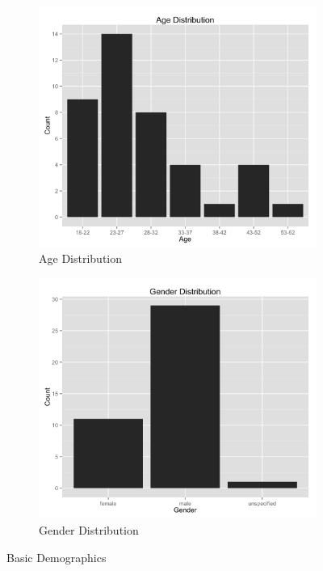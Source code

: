 \documentclass{article}
\begin{document}
\begin{figure}[t]
\centering
\begin{subfigure}{.5\textwidth}
    \centering
    \includegraphics[width=1.0\linewidth]{age.png}
    \caption{Age Distribution}
    \label{agedistribution}
\end{subfigure}%
\begin{subfigure}{.5\textwidth}
    \centering
    \includegraphics[width=1.0\linewidth]{gender.png}
    \caption{Gender Distribution}
    \label{genderdistribution}
\end{subfigure}
\caption{Basic Demographics}
\end{figure}
\end{document}
